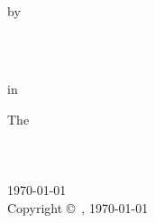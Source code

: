 

\begin{titlepage}
    \centering
    {\huge \ttitle}
    \\[1cm]

    by
    \\[1cm]

    {\Large \authorname}
    \\[1.5cm]

    \begin{minipage}{3in}
      \centering
    \end{minipage}
    \\[1.0cm]

    {\large \degreename}

    in

    \large{The \deptname}
    \\[1cm]
    \large{\subjectname}
    \\[1cm]

    {\large \univname}
    \\[1.3cm]


    \addressname
    \\[0.3cm]
    \monthyeardate\today
    \\[0.5cm]

    {Copyright \copyright\ \authorname, \yeardate\today}
  \end{titlepage}
